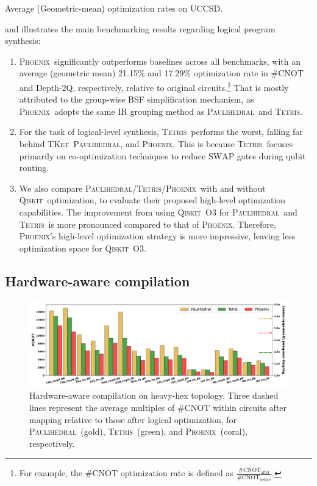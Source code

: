 \documentclass[conference,9pt]{IEEEtran}
\newcommand{\phoenix}{\textsc{Phoenix}}
\newcommand{\qiskit}{\textsc{Qiskit}}
\newcommand{\tket}{\textsc{TKet}}
\newcommand{\tetris}{\textsc{Tetris}}
\newcommand{\paulihedral}{\textsc{Paulihedral}}
\newcommand{\SWAP}{\mathrm{SWAP}}
\newcommand{\CNOT}{\mathrm{CNOT}}
\begin{document}
    \begin{table}[tbp]
        \centering
        \caption{Average (Geometric-mean) optimization rates on UCCSD.}
        \scalebox{0.95}{
                        
        }
        \label{tab:uccsd-avg}        
    \end{table}

     and  illustrates the main benchmarking results regarding logical program synthesis:
    \begin{enumerate}
        \item \phoenix\ significantly outperforms baselines across all benchmarks, with an average (geometric mean) 21.15\% and 17.29\% optimization rate in \#$ \CNOT $ and Depth-2Q, respectively, relative to original circuits.\footnote{For example, the \#$ \CNOT $ optimization rate is defined as $\frac{\#\CNOT_\textrm{after}}{\#\CNOT_\textrm{before}}$.} That is mostly attributed to the group-wise BSF simplification mechanism, as \phoenix\ adopts the same IR grouping method as \paulihedral\ and \tetris.
        \item For the task of logical-level synthesis, \tetris\ performs the worst, falling far behind \tket\, \paulihedral, and \phoenix. This is because \tetris\ focuses primarily on co-optimization techniques to reduce $\SWAP$ gates during qubit routing.
        \item We also compare \paulihedral/\tetris/\phoenix\ with and without \qiskit\ optimization, to evaluate their proposed high-level optimization capabilities. The improvement from using \qiskit\ O3 for \paulihedral\ and \tetris\ is more pronounced compared to that of \phoenix. Therefore, \phoenix's high-level optimization strategy is more impressive, leaving less optimization space for \qiskit\ O3.
    \end{enumerate}


\subsection{Hardware-aware compilation}

    \begin{figure}[tbp]
        \centering
        \includegraphics[width=\columnwidth]{figures/num_2q_gates_manhattan.pdf}
        \caption{Hardware-aware compilation on heavy-hex topology. Three dashed lines represent the average multiples of \#$\CNOT$ within circuits after mapping relative to those after logical optimization, for \paulihedral\ (gold), \tetris\ (green), and \phoenix\ (coral), respectively.}
        \label{fig:manhattan}
    \end{figure}
\end{document}
